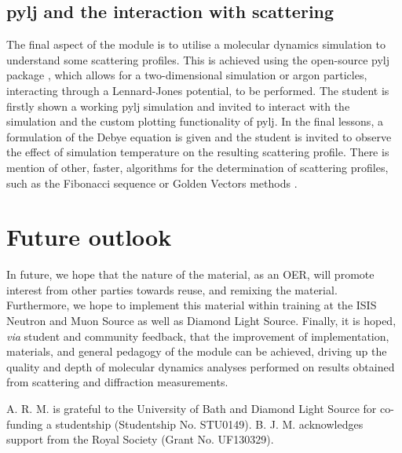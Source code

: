 \documentclass[amsmath,amssymb,twocolumn,superscriptaddress]{revtex4-1}
\begin{document}
\subsection{pylj and the interaction with scattering}

The final aspect of the module is to utilise a molecular dynamics simulation to understand some scattering profiles.
This is achieved using the open-source pylj package \cite{McCluskey2018}, which allows for a two-dimensional simulation or argon particles, interacting through a Lennard-Jones potential, to be performed.
The student is firstly shown a working pylj simulation and invited to interact with the simulation and the custom plotting functionality of pylj.
In the final lessons, a formulation of the Debye equation \cite{Debye1915} is given and the student is invited to observe the effect of simulation temperature on the resulting scattering profile.
There is mention of other, faster, algorithms for the determination of scattering profiles, such as the Fibonacci sequence or Golden Vectors methods \cite{Svergun1994,Watson2013}.

\section{Future outlook}

In future, we hope that the nature of the material, as an OER, will promote interest from other parties towards reuse, and remixing the material.
Furthermore, we hope to implement this material within training at the ISIS Neutron and Muon Source as well as Diamond Light Source.
Finally, it is hoped, \textit{via} student and community feedback, that the improvement of implementation, materials, and general pedagogy of the module can be achieved, driving up the quality and depth of molecular dynamics analyses performed on results obtained from scattering and diffraction measurements.

\begin{acknowledgements}
A. R. M. is grateful to the University of Bath and Diamond Light Source for co-funding a studentship (Studentship No. STU0149).
B. J. M. acknowledges support from the Royal Society (Grant No. UF130329).
\end{acknowledgements}


\end{document}
